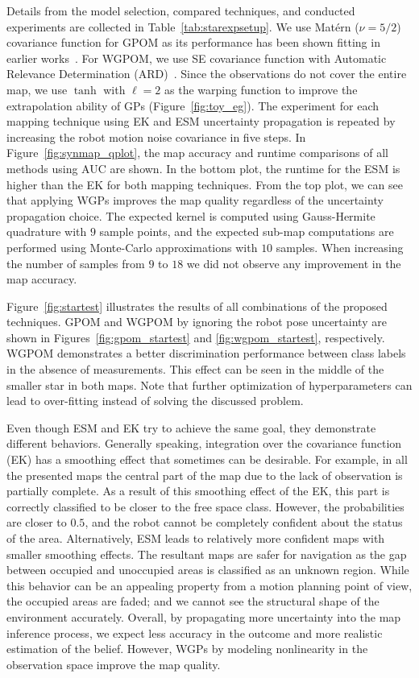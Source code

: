 \documentclass[letterpaper, 10 pt, journal, twoside]{IEEEtran}  %
\begin{document}
Details from the model selection, compared techniques, and conducted experiments are collected in Table~\ref{tab:starexpsetup}. We use Mat\'ern ($\nu = 5/2$) covariance function for GPOM as its performance has been shown fitting in earlier works~\cite{jadidi2016gaussian}. For WGPOM, we use SE covariance function with Automatic Relevance Determination (ARD)~\cite{neal1996bayesian}. Since the observations do not cover the entire map, we use $\tanh$ with $\ell=2$ as the warping function to improve the extrapolation ability of GPs (Figure~\ref{fig:toy_eg}). The experiment for each mapping technique using EK and ESM uncertainty propagation is repeated by increasing the robot motion noise covariance in five steps. In Figure~\ref{fig:synmap_qplot}, the map accuracy and runtime comparisons of all methods using AUC are shown. In the bottom plot, the runtime for the ESM is higher than the EK for both mapping techniques. From the top plot, we can see that applying WGPs improves the map quality regardless of the uncertainty propagation choice. The expected kernel is computed using Gauss-Hermite quadrature with $9$ sample points, and the expected sub-map computations are performed using Monte-Carlo approximations with $10$ samples. When increasing the number of samples from $9$ to $18$ we did not observe any improvement in the map accuracy.

Figure~\ref{fig:startest} illustrates the results of all combinations of the proposed techniques. GPOM and WGPOM by ignoring the robot pose uncertainty are shown in Figures~\ref{fig:gpom_startest} and \ref{fig:wgpom_startest}, respectively. WGPOM demonstrates a better discrimination performance between class labels in the absence of measurements. This effect can be seen in the middle of the smaller star in both maps. Note that further optimization of hyperparameters can lead to over-fitting instead of solving the discussed problem. 

Even though ESM and EK try to achieve the same goal, they demonstrate different behaviors. Generally speaking, integration over the covariance function (EK) has a smoothing effect that sometimes can be desirable. For example, in all the presented maps the central part of the map due to the lack of observation is partially complete. As a result of this smoothing effect of the EK, this part is correctly classified to be closer to the free space class. However, the probabilities are closer to $0.5$, and the robot cannot be completely confident about the status of the area. Alternatively, ESM leads to relatively more confident maps with smaller smoothing effects. The resultant maps are safer for navigation as the gap between occupied and unoccupied areas is classified as an unknown region. While this behavior can be an appealing property from a motion planning point of view, the occupied areas are faded; and we cannot see the structural shape of the environment accurately. Overall, by propagating more uncertainty into the map inference process, we expect less accuracy in the outcome and more realistic estimation of the belief. However, WGPs by modeling nonlinearity in the observation space improve the map quality.
\end{document}
